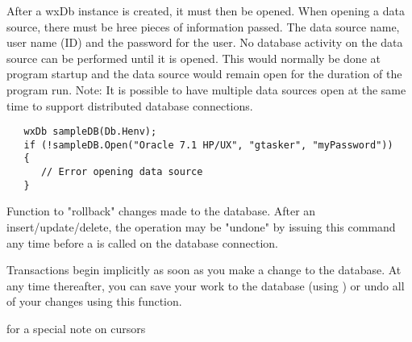 
After a wxDb instance is created, it must then be opened.  When opening a data source, there must be hree pieces of information passed.  The data source name, user name (ID) and the password for the user.  No database activity on the data source can be performed until it is opened.  This would normally be done at program startup and the data source would remain open for the duration of the program run.  Note: It is possible to have multiple data sources open at the same time to support distributed database connections. 

\begin{verbatim}
   wxDb sampleDB(Db.Henv);
   if (!sampleDB.Open("Oracle 7.1 HP/UX", "gtasker", "myPassword"))
   {
      // Error opening data source
   }
\end{verbatim}


\label{wxdbrollbacktrans}


Function to "rollback" changes made to the database.  After an insert/update/delete, the operation may be "undone" by issuing this command any time before a  is called on the database connection.


Transactions begin implicitly as soon as you make a change to the database.  At any time thereafter, you can save your work to the database (using ) or undo all of your changes using this function.



 for a special note on cursors


\label{wxdbsetsqllogging}




